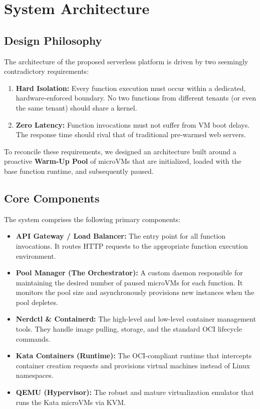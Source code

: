 \documentclass[12pt,a4paper]{report}
\begin{document}
\chapter{System Architecture}

\section{Design Philosophy}
The architecture of the proposed serverless platform is driven by two seemingly contradictory requirements:
\begin{enumerate}
    \item \textbf{Hard Isolation:} Every function execution must occur within a dedicated, hardware-enforced boundary. No two functions from different tenants (or even the same tenant) should share a kernel.
    \item \textbf{Zero Latency:} Function invocations must not suffer from VM boot delays. The response time should rival that of traditional pre-warmed web servers.
\end{enumerate}

To reconcile these requirements, we designed an architecture built around a proactive \textbf{Warm-Up Pool} of microVMs that are initialized, loaded with the base function runtime, and subsequently paused.

\section{Core Components}
The system comprises the following primary components:
\begin{itemize}
    \item \textbf{API Gateway / Load Balancer:} The entry point for all function invocations. It routes HTTP requests to the appropriate function execution environment.
    \item \textbf{Pool Manager (The Orchestrator):} A custom daemon responsible for maintaining the desired number of paused microVMs for each function. It monitors the pool size and asynchronously provisions new instances when the pool depletes.
    \item \textbf{Nerdctl \& Containerd:} The high-level and low-level container management tools. They handle image pulling, storage, and the standard OCI lifecycle commands.
    \item \textbf{Kata Containers (Runtime):} The OCI-compliant runtime that intercepts container creation requests and provisions virtual machines instead of Linux namespaces.
    \item \textbf{QEMU (Hypervisor):} The robust and mature virtualization emulator that runs the Kata microVMs via KVM.
\end{itemize}
\end{document}

